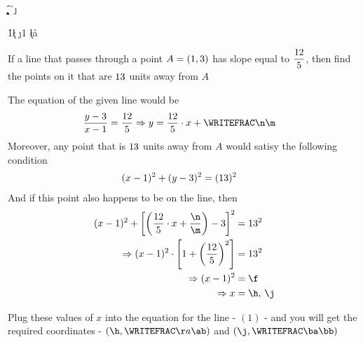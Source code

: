 \FRACMULT\vbthree\vbfour{}\p\q
\FRACMINUS{}\p\q\n\m
\SQUARE\vbfour\a
\SQUARE\vbfive\b
\SQUARE\vbthree\c
\MULTIPLY\a\b\d
\ADD\a\c\e
\DIVIDE\d\e\f
\SQUAREROOT\f\g
\SUBTRACT\vbone\g\h
\ADD\vbone\g\j

\FRACMULT\vbthree\vbfour\h{1}\k\l
\FRACMULT\vbthree\vbfour\j{1}\y\z
\FRACADD\k\l\n\m\aa\ab
\FRACADD\y\z\n\m\ba\bb

\renewcommand{\vbsix}{\dfrac{\vbthree}{\vbfour}}

\question[4] If a line that passes through a point $A = (1, 3)$ has slope equal to $\dfrac{12}{5}$, then 
find the points on it that are $13$ units away from $A$


\watchout

\ifprintanswers
\fi 

\begin{solution}[\halfpage]
	The equation of the given line would be 
	\begin{align}
		\dfrac{y-\vbtwo}{x-\vbone} &= \vbsix \Rightarrow y = \dfrac\vbthree\vbfour\cdot x + \WRITEFRAC\n\m
	\end{align}
	Moreover, any point that is $13$ units away from $A$ would satisy 
	the following condition 
	\begin{align}
		(x - 1)^2 + (y-3)^2 &= (13)^2 
	\end{align}
	And if this point also happens to be on the line, then 
	\begin{align}
		(x-\vbone)^2 + \left[ \left( \vbsix\cdot x + \dfrac\n\m\right) - \vbtwo \right]^2 &= \vbfive^2 \\
		\Rightarrow (x - \vbone)^2\cdot\left[ 1 + \left( \vbsix \right)^2\right] &= \vbfive^2 \\
    \Rightarrow (x - \vbone)^2 &= \f  \\ 
    \Rightarrow x &=  \h,\,\j
	\end{align}
	
    
  Plug these values of $x$ into the equation for the line - $(1)$ - and you will 
  get the required coordinates -  $(\h,\WRITEFRAC\aa\ab)$ and $(\j,\WRITEFRAC\ba\bb)$
\end{solution}

